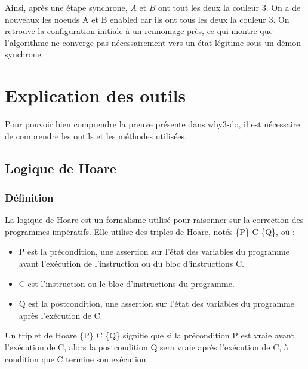 \documentclass[11pt]{article}
\begin{document}
Ainsi, après une étape synchrone, \(A\) et \(B\) ont tout les deux la couleur 3.
On a de nouveaux les noeuds A et B enabled car ils ont tous les deux la couleur 3.
On retrouve la configuration initiale à un rennomage près, ce qui montre que l'algorithme ne converge pas nécessairement vers un état légitime sous un démon synchrone.



\section{Explication des outils}
\label{sec:orgfc94188}
Pour pouvoir bien comprendre la preuve présente dans why3-do, il est nécessaire de comprendre les outils et les méthodes utilisées.

\subsection{Logique de Hoare}
\label{sec:org6bca6d9}

\subsubsection{Définition}
\label{sec:org777e0f4}
La logique de Hoare est un formalisme utilisé pour raisonner sur la correction des programmes impératifs. Elle utilise des triples de Hoare, notés \{P\} C \{Q\}, où :

\begin{itemize}
\item P est la précondition, une assertion sur l'état des variables du programme avant l'exécution de l'instruction ou du bloc d'instructions C.
\item C est l'instruction ou le bloc d'instructions du programme.
\item Q est la postcondition, une assertion sur l'état des variables du programme après l'exécution de C.
\end{itemize}

Un triplet de Hoare \{P\} C \{Q\} signifie que si la précondition P est vraie avant l'exécution de C, alors la postcondition Q sera vraie après l'exécution de C, à condition que C termine son exécution.
\end{document}
